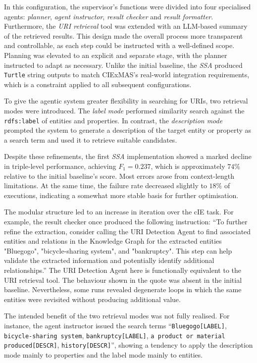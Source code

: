 \documentclass[a4paper,oneside,bibliography=totoc]{scrbook}
\begin{document}
In this configuration, the supervisor's functions were divided into four specialised agents: \textit{planner}, \textit{agent instructor}, \textit{result checker} and \textit{result formatter}. Furthermore, the \textit{\ac{URI} retrieval} tool was extended with an \ac{LLM}-based summary of the retrieved results. This design made the overall process more transparent and controllable, as each step could be instructed with a well-defined scope. Planning was elevated to an explicit and separate stage, with the planner instructed to adapt as necessary. Unlike the initial baseline, the \textit{\ac{SSA}} produced \texttt{Turtle} string outputs to match CIExMAS's real-world integration requirements, which is a constraint applied to all subsequent configurations.

To give the agentic system greater flexibility in searching for \acp{URI}, two retrieval modes were introduced. The \textit{label mode} performed similarity search against the \texttt{rdfs:label} of entities and properties. In contrast, the \textit{description mode} prompted the system to generate a description of the target entity or property as a search term and used it to retrieve suitable candidates.

Despite these refinements, the first \textit{\ac{SSA}} implementation showed a marked decline in triple-level performance, achieving $F_{1}=0.237$, which is approximately \(74\%\) relative to the initial baseline's score. Most errors arose from context-length limitations. At the same time, the failure rate decreased slightly to \(18\%\) of executions, indicating a somewhat more stable basis for further optimisation.

The modular structure led to an increase in iteration over the \ac{cIE} task. For example, the result checker once produced the following instruction: \enquote{To further refine the extraction, consider calling the \ac{URI} Detection Agent to find associated entities and relations in the Knowledge Graph for the extracted entities "Bluegogo", "bicycle-sharing system", and "bankruptcy". This step can help validate the extracted information and potentially identify additional relationships.} The \ac{URI} Detection Agent here is functionally equivalent to the \ac{URI} retrieval tool. The behaviour shown in the quote was absent in the initial baseline. Nevertheless, some runs revealed degenerate loops in which the same entities were revisited without producing additional value.



The intended benefit of the two retrieval modes was not fully realised. For instance, the agent instructor issued the search terms \enquote{\texttt{Bluegogo[LABEL]}, \texttt{bicycle-sharing system\allowbreak[LABEL]}, \texttt{bankruptcy[LABEL]}, \texttt{a product or material produced[DESCR]}, \linebreak[4]\texttt{history[DESCR]}}, showing a tendency to apply the description mode mainly to properties and the label mode mainly to entities.
\end{document}
